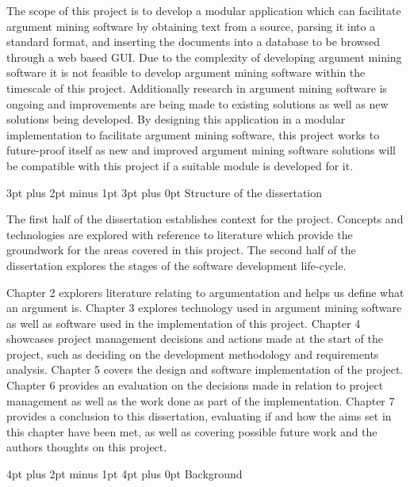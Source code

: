 \documentclass[12pt,a4paper]{article}
\makeatletter
\renewcommand\subsection{\@startsection {subsection}{1}{2mm} %
                               {3pt plus 2pt minus 1pt} %
                               {3pt plus 0pt} %
                               {\normalfont\bfseries}}
\renewcommand\section{\@startsection {section}{1}{0mm} %
                               {4pt plus 2pt minus 1pt} %
                               {4pt plus 0pt} %
                               {\bfseries}}
\makeatother
\begin{document}
The scope of this project is to develop a modular application which can facilitate argument mining software by obtaining text from a source, parsing it into a standard format, and inserting the documents into a database to be browsed through a web based GUI. Due to the complexity of developing argument mining software it is not feasible to develop argument mining software within the timescale of this project. Additionally research in argument mining software is ongoing and improvements are being made to existing solutions as well as new solutions being developed. By designing this application in a modular implementation to facilitate argument mining software, this project works to future-proof itself as new and improved argument mining software solutions will be compatible with this project if a suitable module is developed for it.

\subsection{Structure of the dissertation}

The first half of the dissertation establishes context for the project. Concepts and technologies are explored with reference to literature which provide the groundwork for the areas covered in this project. The second half of the dissertation explores the stages of the software development life-cycle.

Chapter 2 explorers literature relating to argumentation and helps us define what an argument is. Chapter 3 explores technology used in argument mining software as well as software used in the implementation of this project. Chapter 4 showcases project management decisions and actions made at the start of the project, such as deciding on the development methodology and requirements analysis. Chapter 5 covers the design and software implementation of the project. Chapter 6 provides an evaluation on the decisions made in relation to project management as well as the work done as part of the implementation. Chapter 7 provides a conclusion to this dissertation, evaluating if and how the aims set in this chapter have been met, as well as covering possible future work and the authors thoughts on this project.

\newpage


\section{Background}
\end{document}
